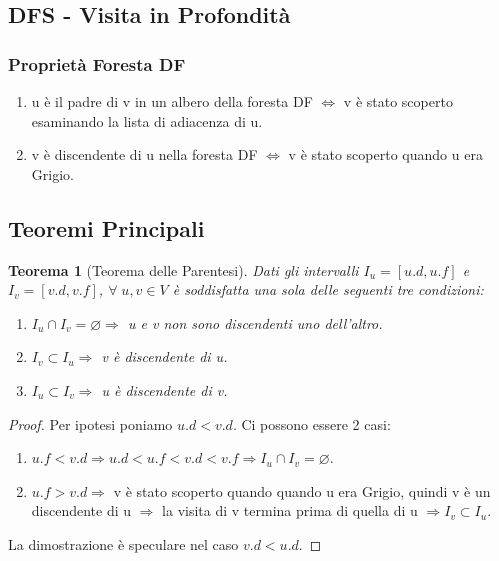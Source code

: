 \documentclass{article}
\newtheorem{theorem}{Teorema}[section]
\begin{document}
\subsection{DFS - Visita in Profondità}

\subsubsection{Proprietà Foresta DF}

\begin{enumerate}
    \item u è il padre di v in un albero della foresta DF $\Leftrightarrow$ v è stato scoperto esaminando la lista di adiacenza di u.
    \item v è discendente di u nella foresta DF $\Leftrightarrow$ v è stato scoperto quando u era Grigio.
\end{enumerate}

\subsection{Teoremi Principali}

\begin{theorem}[Teorema delle Parentesi]
    Dati gli intervalli $I_u = [u.d, u.f]$ e $I_v = [v.d, v.f]$, $\forall \; u, v \in V$ è soddisfatta una sola delle seguenti tre condizioni:
    \begin{enumerate}
        \item $I_u \cap I_v = \varnothing \Rightarrow$ u e v non sono discendenti uno dell'altro.
        \item $I_v \subset I_u \Rightarrow$ v è discendente di u.
        \item $I_u \subset I_v \Rightarrow$ u è discendente di v.
    \end{enumerate}
\end{theorem}

\begin{proof}
    Per ipotesi poniamo $u.d < v.d$. Ci possono essere 2 casi:
    \begin{enumerate}
        \item $u.f < v.d \Rightarrow u.d < u.f < v.d < v.f \Rightarrow I_u \cap I_v = \varnothing$.
        \item $u.f > v.d \Rightarrow$ v è stato scoperto quando quando u era Grigio, quindi v è un discendente di u $\Rightarrow$ la visita di v termina prima di quella di u $\Rightarrow I_v \subset I_u$.  
    \end{enumerate}
    La dimostrazione è speculare nel caso $v.d < u.d$.
\end{proof}
\end{document}
